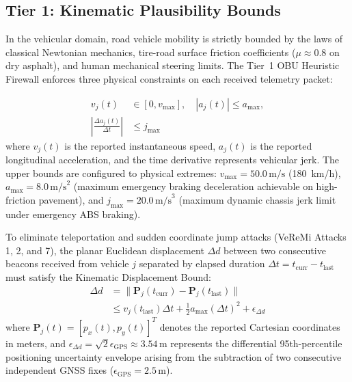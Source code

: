 \documentclass[conference]{IEEEtran}
\begin{document}
\subsection{Tier 1: Kinematic Plausibility Bounds}

In the vehicular domain, road vehicle mobility is strictly bounded by the laws of classical Newtonian mechanics, tire-road surface friction coefficients ($\mu \approx 0.8$ on dry asphalt), and human mechanical steering limits. The Tier~1 OBU Heuristic Firewall enforces three physical constraints on each received telemetry packet:

\begin{equation}
\begin{aligned}
v_j(t) &\in [0, v_{\text{max}}], \quad |a_j(t)| \le a_{\text{max}}, \\
\left|\frac{\Delta a_j(t)}{\Delta t}\right| &\le j_{\text{max}}
\end{aligned}
\label{eq:kin_bounds}
\end{equation}
where $v_j(t)$ is the reported instantaneous speed, $a_j(t)$ is the reported longitudinal acceleration, and the time derivative represents vehicular jerk. The upper bounds are configured to physical extremes: $v_{\text{max}} = 50.0\,\text{m/s}$ (180~km/h), $a_{\text{max}} = 8.0\,\text{m/s}^2$ (maximum emergency braking deceleration achievable on high-friction pavement), and $j_{\text{max}} = 20.0\,\text{m/s}^3$ (maximum dynamic chassis jerk limit under emergency ABS braking).

To eliminate teleportation and sudden coordinate jump attacks (VeReMi Attacks 1, 2, and 7), the planar Euclidean displacement $\Delta d$ between two consecutive beacons received from vehicle $j$ separated by elapsed duration $\Delta t = t_{\text{curr}} - t_{\text{last}}$ must satisfy the Kinematic Displacement Bound:
\begin{equation}
\begin{aligned}
\Delta d &= \|\mathbf{P}_j(t_{\text{curr}}) - \mathbf{P}_j(t_{\text{last}})\| \\
&\le v_j(t_{\text{last}})\Delta t + \frac{1}{2}a_{\text{max}}(\Delta t)^2 + \epsilon_{\Delta d}
\end{aligned}
\label{eq:disp_bound}
\end{equation}
where $\mathbf{P}_j(t) = [p_x(t), p_y(t)]^T$ denotes the reported Cartesian coordinates in meters, and $\epsilon_{\Delta d} = \sqrt{2}\epsilon_{\text{GPS}} \approx 3.54\,\text{m}$ represents the differential 95th-percentile positioning uncertainty envelope arising from the subtraction of two consecutive independent GNSS fixes ($\epsilon_{\text{GPS}} = 2.5\,\text{m}$).
\end{document}
